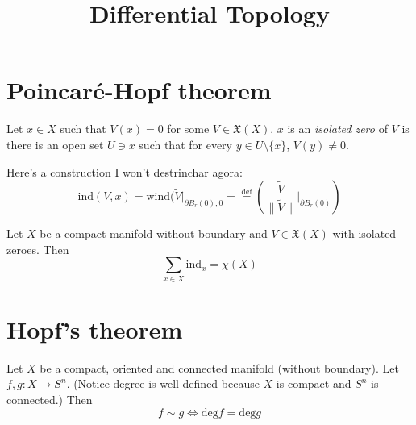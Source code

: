 



\title{Differential Topology}
\maketitle

\label{section-phantom}

\tableofcontents

\section{Poincaré-Hopf theorem}
\label{section-Poincare-Hopf-theorem}

\begin{definition}
\label{definition-isolated-zero-vector-field}
Let $x \in X$ such that $V(x)=0$ for some $V \in \mathfrak{X}(X)$. $x$ is an
{\it isolated zero} of  $V$ is there is an open set $U \ni x$ such that for
every $y \in U\setminus \{x\}$, $V(y) \neq 0$.
\end{definition}

\begin{definition}
\label{definition-degree-zero-vector-field}
Here's a construction I won't destrinchar agora:
$$
\text{ind}(V,x)=\text{wind}(\tilde{V}|_{\partial
B_r(0),0}=\overset{\text{def}}{=}\left(\frac{\tilde{V}}{\|\tilde{V}\|}\Big|_{\partial
B_r(0)}\right)
$$
\end{definition}

\begin{theorem}
\label{theorem-Poincare-Hopf}
Let $X$ be a compact manifold without boundary and $V \in \mathfrak{X}(X)$ with
isolated zeroes. Then
$$
\sum_{x \in X}\text{ind}_x=\chi(X)
$$
\end{theorem}

\section{Hopf's theorem}
\label{section-Hopf-theorem}

\begin{theorem}[Hopf]
\label{theorem-Hopf}
Let $X$ be a compact, oriented and connected manifold (without boundary). Let
$f,g:X \to S^n$. (Notice degree is well-defined because $X$ is compact and
$S^n$ is connected.) Then
$$
f \sim g \iff \text{deg}f=\text{deg}g
$$
\end{theorem}






